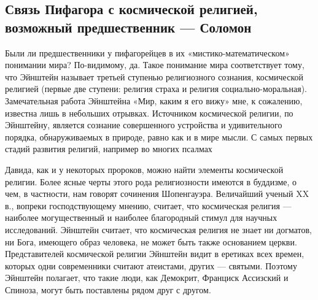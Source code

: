 \subsection{Связь Пифагора с космической религией, возможный
предшественник --- Соломон}

Были ли предшественники у пифагорейцев в их
«мистико-математическом» понимании мира? По-видимому, да. Такое
понимание мира соответствует тому, что Эйнштейн называет третьей
ступенью религиозного сознания, космической религией (первые две
ступени: религия страха и религия социально-моральная). Замечательная
работа Эйнштейна «Мир, каким я его вижу» мне, к сожалению, известна
лишь в небольших отрывках. Источником космической религии, по
Эйнштейну, является сознание совершенного устройства и удивительного
порядка, обнаруживаемых в природе, равно как и в мире мысли. С самых
первых стадий развития религий, например во многих псалмах

Давида, как и у некоторых пророков, можно найти элементы космической
религии. Более ясные черты этого рода религиозности имеются в
буддизме, о чем, в частности, нам говорят сочинения Шопенгауэра.
Величайший ученый XX в., вопреки господствующему мнению, считает, что
космическая религия --- наиболее могущественный и наиболее благородный
стимул для научных исследований. Эйнштейн считает, что космическая
религия не знает ни догматов, ни Бога, имеющего образ человека, не
может быть также основанием церкви. Представителей космической религии
Эйнштейн видит в еретиках всех времен, которых одни современники
считают атеистами, других --- святыми. Поэтому Эйнштейн полагает, что
такие люди, как Демокрит, Франциск Ассизский и Спиноза, могут быть
поставлены рядом друг с другом.

